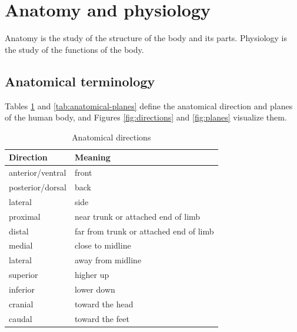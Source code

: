 \section{Anatomy and physiology}
Anatomy is the study of the structure of the body and its parts. Physiology is the study of the functions of the body.

\subsection{Anatomical terminology}
Tables \ref{tab:anatomical-directions} and \ref{tab:anatomical-planes} define the anatomical direction and planes of the human body, and Figures \ref{fig:directions} and \ref{fig:planes} visualize them.

\begin{table}[htbp]
  \centering
  \begin{tabularx}{\linewidth}{lX}
    \toprule
    Direction & Meaning \\
    \midrule
    anterior/ventral & front \\
    posterior/dorsal & back \\
    lateral & side \\
    proximal & near trunk or attached end of limb \\
    distal & far from trunk or attached end of limb \\
    medial & close to midline \\
    lateral & away from midline \\
    superior & higher up \\
    inferior & lower down \\
    cranial & toward the head \\
    caudal & toward the feet \\
    \bottomrule
  \end{tabularx}
  \caption{Anatomical directions}
  \label{tab:anatomical-directions}
\end{table}

